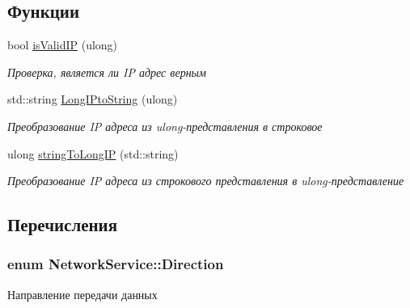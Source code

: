 \subsection*{Функции}
\begin{DoxyCompactItemize}
\item 
bool \hyperlink{namespace_network_service_a4e78f6978578fd3ee62f1c3f8b555009}{is\+Valid\+I\+P} (ulong)
\begin{DoxyCompactList}\small\item\em Проверка, является ли I\+P адрес верным \end{DoxyCompactList}\item 
std\+::string \hyperlink{namespace_network_service_a814602dad243fba31a6b60d5c56587ac}{Long\+I\+Pto\+String} (ulong)
\begin{DoxyCompactList}\small\item\em Преобразование I\+P адреса из ulong-\/представления в строковое \end{DoxyCompactList}\item 
ulong \hyperlink{namespace_network_service_a72263b9e1be1b1629b46daa243761ab9}{string\+To\+Long\+I\+P} (std\+::string)
\begin{DoxyCompactList}\small\item\em Преобразование I\+P адреса из строкового представления в ulong-\/представление \end{DoxyCompactList}\end{DoxyCompactItemize}


\subsection{Перечисления}
\hypertarget{namespace_network_service_abe1196dad9e8afcbc5c6b38196ce2c65}{}
\subsubsection[{Direction}]{\setlength{\rightskip}{0pt plus 5cm}enum {\bf Network\+Service\+::\+Direction}}\label{namespace_network_service_abe1196dad9e8afcbc5c6b38196ce2c65}


Направление передачи данных 

